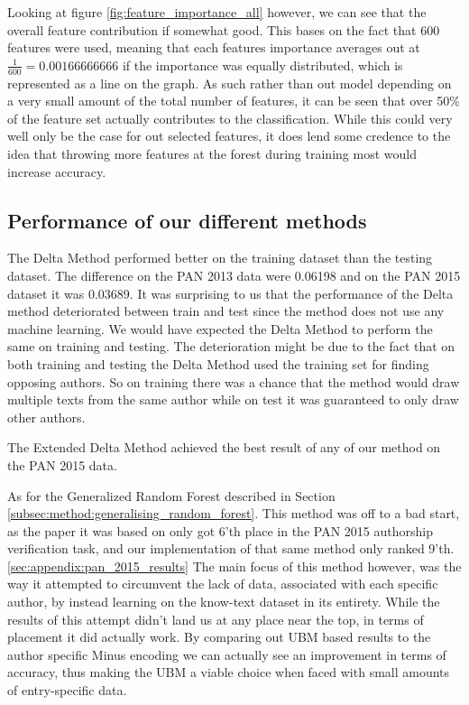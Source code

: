 Looking at figure \ref{fig:feature_importance_all} however, we can see that
the overall feature contribution if somewhat good. This bases on the fact
that 600 features were used, meaning that each features importance
averages out at $\frac{1}{600} = 0.00166666666$ if the importance was
equally distributed, which is represented as a line on the graph. As such
rather than out model depending on a very small amount of the total number
of features, it can be seen that over 50\% of the feature set actually
contributes to the classification. While this could very well only be the case
for out selected features, it does lend some credence to the idea that throwing
more features at the forest during training most would increase accuracy.

\subsection{Performance of our different methods}
The Delta Method performed better on the training dataset than the testing
dataset. The difference on the PAN 2013 data were 0.06198 and on the PAN 2015
dataset it was 0.03689. It was surprising to us that the performance of the
Delta method deteriorated between train and test since the method does not use
any machine learning. We would have expected the Delta Method to perform the
same on training and testing. The deterioration might be due to the fact that
on both training and testing the Delta Method used the training set for finding
opposing authors. So on training there was a chance that the method would draw
multiple texts from the same author while on test it was guaranteed to only draw
other authors.

The Extended Delta Method achieved the best result of any of our method on the
PAN 2015 data. %

As for the Generalized Random Forest described in Section
\ref{subsec:method:generalising_random_forest}. This method was off to a bad
start, as the paper it was based on \cite{pacheco2015} only got 6'th place in
the PAN 2015 authorship verification task, and our implementation of that same
method only ranked 9'th. \ref{sec:appendix:pan_2015_results} The main focus of
this method however, was the way it attempted to circumvent the lack of data,
associated with each specific author, by instead learning on the know-text
dataset in its entirety. While the results of this attempt didn't land us at any
place near the top, in terms of placement it did actually work. By comparing
out \gls{UBM} based results to the author specific Minus encoding we can
actually see an improvement in terms of accuracy, thus making the \gls{UBM} 
a viable choice when faced with small amounts of entry-specific data.

